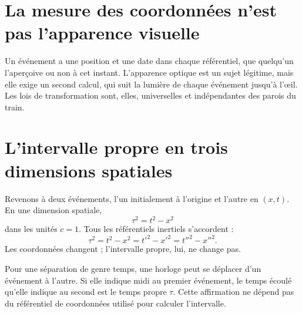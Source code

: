 \section{La mesure des coordonnées n’est pas l’apparence visuelle}

\begin{classroomqa}
\end{classroomqa}

Un événement a une position et une date dans chaque référentiel, que quelqu’un l’aperçoive ou non à cet instant. L’apparence optique est un sujet légitime, mais elle exige un second calcul, qui suit la lumière de chaque événement jusqu’à l’œil. Les lois de transformation sont, elles, universelles et indépendantes des parois du train.

\section{L’intervalle propre en trois dimensions spatiales}

Revenons à deux événements, l’un initialement à l’origine et l’autre en \((x,t)\). En une dimension spatiale,
\begin{equation}
\tau^2=t^2-x^2
\label{eq:sr2-interval-1d}
\end{equation}
dans les unités \(c=1\). Tous les référentiels inertiels s’accordent :
\begin{equation}
\tau^2
=t^2-x^2
=t'^2-x'^2
=t''^2-x''^2.
\end{equation}
Les coordonnées changent ; l’intervalle propre, lui, ne change pas.

Pour une séparation de genre temps, une horloge peut se déplacer d’un événement à l’autre. Si elle indique midi au premier événement, le temps écoulé qu’elle indique au second est le temps propre \(\tau\). Cette affirmation ne dépend pas du référentiel de coordonnées utilisé pour calculer l’intervalle.

